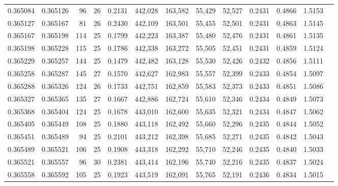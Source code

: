 \begin{tabular}{rrrrrrrrrrrrr}
0.365084 & 0.365126 &    96 &  26 &                                     0.2131 & 442,028 & 163,582 &  55,429 &  52,527 & 0.2431 & 0.4866 & 1.5153 \\
0.365127 & 0.365167 &    81 &  26 &                                     0.2430 & 442,109 & 163,501 &  55,455 &  52,501 & 0.2431 & 0.4863 & 1.5145 \\
0.365167 & 0.365198 &   114 &  25 &                                     0.1799 & 442,223 & 163,387 &  55,480 &  52,476 & 0.2431 & 0.4861 & 1.5135 \\
0.365198 & 0.365228 &   115 &  25 &                                     0.1786 & 442,338 & 163,272 &  55,505 &  52,451 & 0.2431 & 0.4859 & 1.5124 \\
0.365229 & 0.365257 &   144 &  25 &                                     0.1479 & 442,482 & 163,128 &  55,530 &  52,426 & 0.2432 & 0.4856 & 1.5111 \\
0.365258 & 0.365287 &   145 &  27 &                                     0.1570 & 442,627 & 162,983 &  55,557 &  52,399 & 0.2433 & 0.4854 & 1.5097 \\
0.365288 & 0.365326 &   124 &  26 &                                     0.1733 & 442,751 & 162,859 &  55,583 &  52,373 & 0.2433 & 0.4851 & 1.5086 \\
0.365327 & 0.365365 &   135 &  27 &                                     0.1667 & 442,886 & 162,724 &  55,610 &  52,346 & 0.2434 & 0.4849 & 1.5073 \\
0.365368 & 0.365404 &   124 &  25 &                                     0.1678 & 443,010 & 162,600 &  55,635 &  52,321 & 0.2434 & 0.4847 & 1.5062 \\
0.365405 & 0.365449 &   108 &  25 &                                     0.1880 & 443,118 & 162,492 &  55,660 &  52,296 & 0.2435 & 0.4844 & 1.5052 \\
0.365451 & 0.365489 &    94 &  25 &                                     0.2101 & 443,212 & 162,398 &  55,685 &  52,271 & 0.2435 & 0.4842 & 1.5043 \\
0.365489 & 0.365521 &   106 &  25 &                                     0.1908 & 443,318 & 162,292 &  55,710 &  52,246 & 0.2435 & 0.4840 & 1.5033 \\
0.365521 & 0.365557 &    96 &  30 &                                     0.2381 & 443,414 & 162,196 &  55,740 &  52,216 & 0.2435 & 0.4837 & 1.5024 \\
0.365558 & 0.365592 &   105 &  25 &                                     0.1923 & 443,519 & 162,091 &  55,765 &  52,191 & 0.2436 & 0.4834 & 1.5015 \\

\end{tabular}
